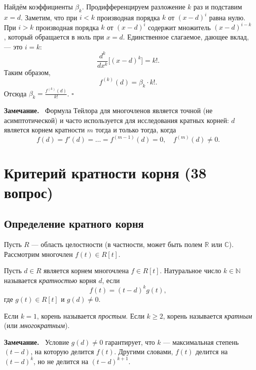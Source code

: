 \documentclass[a4paper,12pt]{article}
\newcommand{\myremark}{\textbf{Замечание.}\ }
\theoremstyle{definition}
\theoremstyle{plain}
\theoremstyle{remark}
\begin{document}
	Найдём коэффициенты \( \beta_k \). Продифференцируем разложение \( k \) раз и подставим \( x = d \). Заметим, что при \( i < k \) производная порядка \( k \) от \( (x-d)^i \) равна нулю. При \( i > k \) производная порядка \( k \) от \( (x-d)^i \) содержит множитель \( (x-d)^{i-k} \), который обращается в ноль при \( x = d \). Единственное слагаемое, дающее вклад, — это \( i = k \):
	\[
	\frac{d^k}{dx^k}\big[(x-d)^k\big] = k!.
	\]
	Таким образом,
	\[
	f^{(k)}(d) = \beta_k \cdot k!.
	\]
	Отсюда \( \beta_k = \frac{f^{(k)}(d)}{k!} \). \hfill \(\square\)
	
	\myremark
	Формула Тейлора для многочленов является точной (не асимптотической) и часто используется для исследования кратных корней: \( d \) является корнем кратности \( m \) тогда и только тогда, когда
	\[
	f(d) = f'(d) = \dots = f^{(m-1)}(d) = 0, \quad f^{(m)}(d) \neq 0.
	\]
	
	
	
	
	
	
	
	
	
	\newpage
	\section{Критерий кратности корня (38 вопрос)}
	
	\subsection{Определение кратного корня}
	
	Пусть \( R \) — область целостности (в частности, может быть полем \( \mathbb{R} \) или \( \mathbb{C} \)). Рассмотрим многочлен \( f(t) \in R[t] \).
	
	\begin{tcolorbox}[colback=blue!5, colframe=blue!40!black, title=Определение]
		Пусть \( d \in R \) является корнем многочлена \( f \in R[t] \). Натуральное число \( k \in \mathbb{N} \) называется \textit{кратностью} корня \( d \), если
		\[
		f(t) = (t - d)^k g(t),
		\]
		где \( g(t) \in R[t] \) и \( g(d) \neq 0 \). 
		
		Если \( k = 1 \), корень называется \textit{простым}. Если \( k \geq 2 \), корень называется \textit{кратным} (или \textit{многократным}).
	\end{tcolorbox}
	
	\myremark
	Условие \( g(d) \neq 0 \) гарантирует, что \( k \) — максимальная степень \( (t - d) \), на которую делится \( f(t) \). Другими словами, \( f(t) \) делится на \( (t - d)^k \), но не делится на \( (t - d)^{k+1} \).
	
\end{document}

